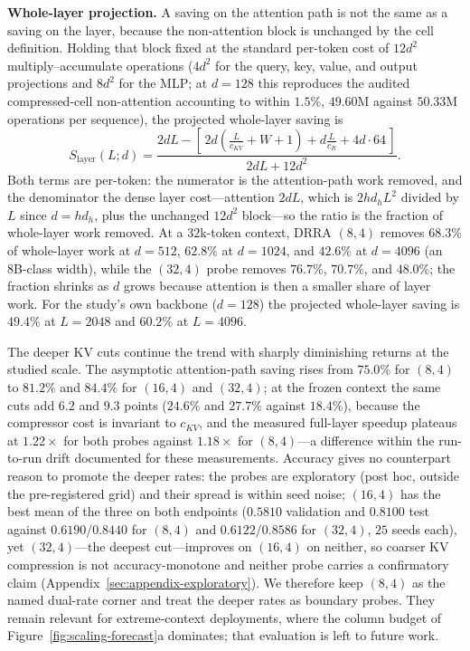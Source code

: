 \textbf{Whole-layer projection.} A saving on the attention path is not
the same as a saving on the layer, because the non-attention block is
unchanged by the cell definition. Holding that block fixed at the
standard per-token cost of $12 d^2$ multiply--accumulate operations
($4 d^2$ for the query, key, value, and output projections and $8 d^2$
for the MLP; at $d{=}128$ this reproduces the audited compressed-cell
non-attention accounting to within $1.5\%$, $49.60$M against $50.33$M
operations per sequence), the projected whole-layer saving is
\begin{equation}
\label{eq:cf-whole}
S_{\mathrm{layer}}(L; d) =
\frac{2dL - \left[\,2d\!\left(\frac{L}{c_{KV}} + W + 1\right)
+ d \frac{L}{c_R} + 4d\cdot 64\,\right]}{2dL + 12 d^{2}}.
\end{equation}
Both terms are per-token: the numerator is the attention-path work
removed, and the denominator the dense layer cost---attention $2dL$,
which is $2 h d_h L^2$ divided by $L$ since $d = h d_h$, plus the
unchanged $12 d^2$ block---so the ratio is the fraction of
whole-layer work removed. At a
$32$k-token context, DRRA $(8,4)$ removes $68.3\%$ of whole-layer
work at $d{=}512$, $62.8\%$ at $d{=}1024$, and $42.6\%$ at $d{=}4096$
(an 8B-class width), while the $(32,4)$ probe removes $76.7\%$,
$70.7\%$, and $48.0\%$; the fraction shrinks as $d$ grows because
attention is then a smaller share of layer work. For the study's own
backbone ($d{=}128$) the projected whole-layer saving is $49.4\%$ at
$L{=}2048$ and $60.2\%$ at $L{=}4096$.

The deeper KV cuts continue the trend with sharply diminishing returns at
the studied scale. The asymptotic attention-path saving rises from
$75.0\%$ for $(8,4)$ to $81.2\%$ and $84.4\%$ for $(16,4)$ and $(32,4)$;
at the frozen context the same cuts add $6.2$ and $9.3$ points
($24.6\%$ and $27.7\%$ against $18.4\%$), because the compressor cost is
invariant to $c_{KV}$, and the measured full-layer speedup plateaus at
$1.22\times$ for both probes against $1.18\times$ for $(8,4)$---a
difference within the run-to-run drift documented for these measurements.
Accuracy
gives no counterpart reason to promote the deeper rates: the probes are
exploratory (post hoc, outside the pre-registered grid) and their spread
is within seed noise; $(16,4)$ has the best mean of the three on both
endpoints ($0.5810$ validation and $0.8100$ test against $0.6190$/$0.8440$
for $(8,4)$ and $0.6122$/$0.8586$ for $(32,4)$, $25$ seeds each), yet
$(32,4)$---the deepest cut---improves on $(16,4)$ on neither, so coarser
KV compression is not accuracy-monotone and neither probe carries a
confirmatory claim (Appendix~\ref{sec:appendix-exploratory}). We therefore
keep $(8,4)$ as the named dual-rate corner and treat the deeper rates as
boundary probes. They remain relevant for extreme-context deployments,
where the column budget of Figure~\ref{fig:scaling-forecast}a dominates;
that evaluation is left to future work.

